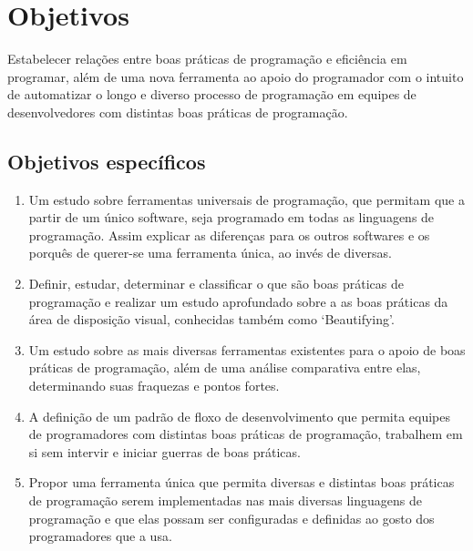 \section{Objetivos}

    Estabelecer relações entre boas práticas de programação e eficiência em programar, além de uma
    nova ferramenta ao apoio do programador com o intuito de automatizar o longo e diverso processo
    de programação em equipes de desenvolvedores com distintas boas práticas de programação.

\subsection{Objetivos específicos}

    \begin{enumerate}

        \item

        Um estudo sobre ferramentas universais de programação, que permitam que a partir de um único
        software, seja programado em todas as linguagens de programação. Assim explicar as
        diferenças para os outros softwares e os porquês de querer-se uma ferramenta única, ao invés
        de diversas.

        \item

        Definir, estudar, determinar e classificar o que são boas práticas de programação e realizar
        um estudo aprofundado sobre a as boas práticas da área de disposição visual, conhecidas
        também como `Beautifying'.

        \item

        Um estudo sobre as mais diversas ferramentas existentes para o apoio de boas práticas de
        programação, além de uma análise comparativa entre elas, determinando suas fraquezas e
        pontos fortes.

        \item

        A definição de um padrão de floxo de desenvolvimento que permita equipes de programadores
        com distintas boas práticas de programação, trabalhem em si sem intervir e iniciar guerras
        de boas práticas.

        \item

        Propor uma ferramenta única que permita diversas e distintas boas práticas de programação serem
        implementadas nas mais diversas linguagens de programação e que elas possam ser configuradas
        e definidas ao gosto dos programadores que a usa.

    \end{enumerate}


